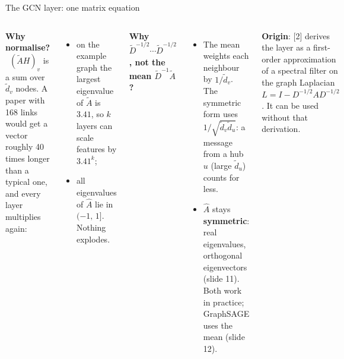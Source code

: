 \documentclass[aspectratio=169,10pt]{beamer}
\renewcommand{\cite}[1]{{\scriptsize\color{cTok}[#1]}}
\newcommand{\key}[1]{\textbf{\color{cAtt}#1}}
\newcommand{\Ah}{\hat A}
\newcommand{\At}{\tilde A}
\newcommand{\Dt}{\tilde D}
\newcommand{\dt}{\tilde d}
\begin{document}
\begin{frame}{The GCN layer: one matrix equation}
\begin{columns}[T,onlytextwidth]
\vspace{1.5mm}
\key{Why normalise?} \ $(\At H)_v$ is a sum over $\dt_v$ nodes. A paper with 168 links would get
a vector roughly 40 times longer than a typical one, and every layer multiplies again:
\begin{itemize}\footnotesize
  \item on the example graph the largest eigenvalue of $\At$ is $3.41$, so $k$ layers can scale
        features by $3.41^k$;
  \item all eigenvalues of $\Ah$ lie in $(-1,\,1]$. Nothing explodes.
\end{itemize}

\vspace{0.5mm}
\key{Why $\Dt^{-1/2}\cdots\Dt^{-1/2}$, not the mean $\Dt^{-1}\At$?}
\begin{itemize}\footnotesize
  \item The mean weights each neighbour by $1/\dt_v$. The symmetric form uses $1/\sqrt{\dt_v\dt_u}$:
        a message from a hub $u$ (large $\dt_u$) counts for less.
  \item $\Ah$ stays \textbf{symmetric}: real eigenvalues, orthogonal eigenvectors (slide 11).
        Both work in practice; GraphSAGE uses the mean (slide 12).
\end{itemize}
\vspace{0.5mm}
{\footnotesize \textbf{Origin}: \cite{2} derives the layer as a first-order approximation of a spectral filter on
the graph Laplacian $L=I-D^{-1/2}AD^{-1/2}$. It can be used without that derivation.}
\end{columns}
\end{frame}
\end{document}
